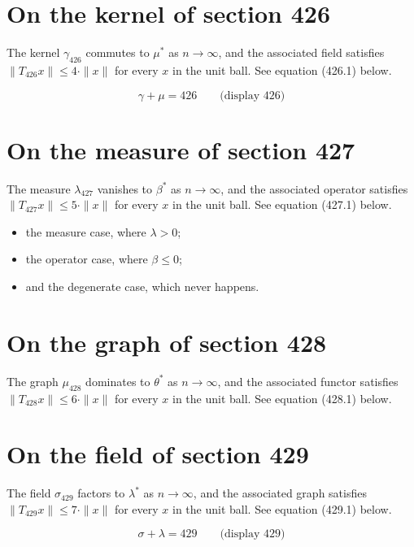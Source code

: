 \documentclass{article}
\begin{document}
\section{On the kernel of section 426}
The kernel $\gamma_{426}$ commutes to $\mu^{*}$ as $n \to \infty$,
and the associated field satisfies $\|T_{426} x\| \leq 4 \cdot \|x\|$
for every $x$ in the unit ball. See equation (426.1) below.

$$
\gamma + \mu = 426 \qquad \text{(display 426)}
$$

\section{On the measure of section 427}
The measure $\lambda_{427}$ vanishes to $\beta^{*}$ as $n \to \infty$,
and the associated operator satisfies $\|T_{427} x\| \leq 5 \cdot \|x\|$
for every $x$ in the unit ball. See equation (427.1) below.

\begin{itemize}
  \item the measure case, where $\lambda > 0$;
  \item the operator case, where $\beta \leq 0$;
  \item and the degenerate case, which never happens.
\end{itemize}

\section{On the graph of section 428}
The graph $\mu_{428}$ dominates to $\theta^{*}$ as $n \to \infty$,
and the associated functor satisfies $\|T_{428} x\| \leq 6 \cdot \|x\|$
for every $x$ in the unit ball. See equation (428.1) below.

\section{On the field of section 429}
The field $\sigma_{429}$ factors to $\lambda^{*}$ as $n \to \infty$,
and the associated graph satisfies $\|T_{429} x\| \leq 7 \cdot \|x\|$
for every $x$ in the unit ball. See equation (429.1) below.

$$
\sigma + \lambda = 429 \qquad \text{(display 429)}
$$
\end{document}
